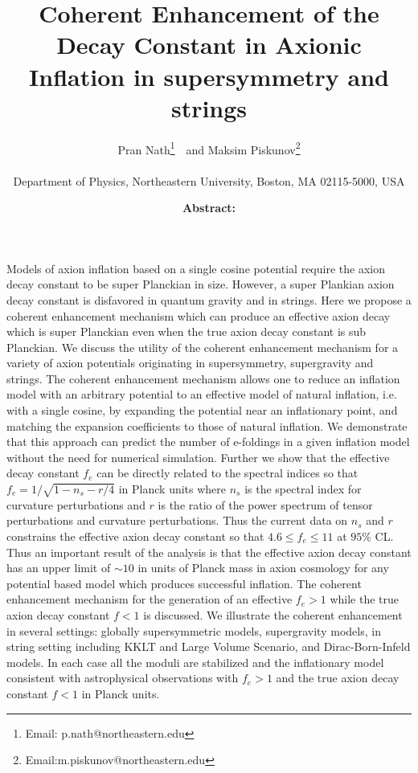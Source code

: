 \documentclass[12pt]{article}
\author{
Pran Nath\footnote{Email: p.nath@northeastern.edu}~\ and 
Maksim Piskunov\footnote{Email:m.piskunov@northeastern.edu}\\~\\
Department of Physics, Northeastern University,
Boston, MA 02115-5000, USA
}
\title{Coherent Enhancement 
 of the Decay Constant in Axionic Inflation
 in supersymmetry and strings}
\begin{document}
\maketitle
\date

\textbf{Abstract: } 
  Models of axion inflation based on a  single cosine potential require the axion decay constant to be super Planckian in size. However, a super Plankian axion
  decay constant is disfavored in quantum gravity and in strings. Here we propose a coherent enhancement mechanism which can produce an 
  effective axion decay which is super Planckian even when the true axion decay constant is sub Planckian.  We discuss the utility of the coherent 
  enhancement mechanism for a variety of axion potentials originating in supersymmetry, supergravity and strings.  The coherent 
enhancement mechanism allows one  to reduce an inflation model with an arbitrary potential to an effective model of natural inflation, i.e. with a single cosine, by expanding the potential near an inflationary point, and matching the expansion coefficients to those of natural inflation. We demonstrate that this approach can predict the number of e-foldings in a given inflation model without the need for numerical simulation. Further we show that  the effective decay constant $f_e$ can be directly related to the spectral indices so that 
$f_e=  1/\sqrt{1-n_s-r/4}$ in Planck units where $n_s$ is the spectral index for curvature perturbations and $r$ is the ratio of 
the power spectrum of tensor perturbations and curvature perturbations. Thus the current data on $n_s$ and $r$ constrains the effective 
axion decay constant so that   $4.6 \leq f_e\leq 11$ at $95\%$ CL.
Thus an important result of the analysis is that the effective axion decay constant has an upper limit
of $\sim 10$ in units of Planck mass in axion cosmology for any potential based model which produces successful inflation.
The coherent enhancement  mechanism for the generation of an effective $f_e >1$ while the true axion decay constant $f<1$ is 
discussed.
We illustrate the coherent enhancement in several settings:  globally supersymmetric models, supergravity models,  
in string setting including KKLT and Large Volume Scenario, and 
Dirac-Born-Infeld models.
 In each case all the moduli are stabilized and 
the inflationary model consistent with astrophysical observations with $f_e>1$ and  the true axion decay constant 
$f<1$ in Planck units.
 \newpage
 

\end{document}
